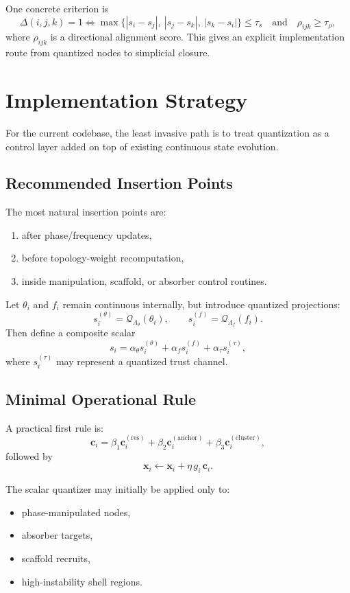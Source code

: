 \documentclass[11pt,a4paper]{article}
\begin{document}
One concrete criterion is
\[
\Delta(i,j,k)=1
\iff
\max\{|s_i-s_j|,\ |s_j-s_k|,\ |s_k-s_i|\} \le \tau_s
\quad\text{and}\quad
\rho_{ijk} \ge \tau_\rho,
\]
where $\rho_{ijk}$ is a directional alignment score. This gives an explicit
implementation route from quantized nodes to simplicial closure.

\section{Implementation Strategy}
For the current codebase, the least invasive path is to treat quantization as a
control layer added on top of existing continuous state evolution.

\subsection{Recommended Insertion Points}
The most natural insertion points are:
\begin{enumerate}[label=\arabic*.]
    \item after phase/frequency updates,
    \item before topology-weight recomputation,
    \item inside manipulation, scaffold, or absorber control routines.
\end{enumerate}

Let $\theta_i$ and $f_i$ remain continuous internally, but introduce quantized
projections:
\[
s_i^{(\theta)} = \mathcal{Q}_{\Lambda_\theta}(\theta_i),
\qquad
s_i^{(f)} = \mathcal{Q}_{\Lambda_f}(f_i).
\]
Then define a composite scalar
\[
s_i = \alpha_\theta s_i^{(\theta)} + \alpha_f s_i^{(f)} + \alpha_\tau s_i^{(\tau)},
\]
where $s_i^{(\tau)}$ may represent a quantized trust channel.

\subsection{Minimal Operational Rule}
A practical first rule is:
\[
\mathbf{c}_i
=
\beta_1 \mathbf{c}_i^{(\mathrm{res})}
+
\beta_2 \mathbf{c}_i^{(\mathrm{anchor})}
+
\beta_3 \mathbf{c}_i^{(\mathrm{cluster})},
\]
followed by
\[
\mathbf{x}_i \leftarrow \mathbf{x}_i + \eta\, g_i\, \mathbf{c}_i.
\]

The scalar quantizer may initially be applied only to:
\begin{itemize}
    \item phase-manipulated nodes,
    \item absorber targets,
    \item scaffold recruits,
    \item high-instability shell regions.
\end{itemize}
\end{document}
